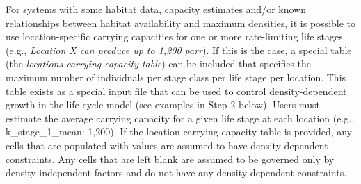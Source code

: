 \documentclass[
  letterpaper,
  DIV=11,
  numbers=noendperiod]{scrreprt}
\begin{document}
For systems with some habitat data, capacity estimates and/or known
relationships between habitat availability and maximum densities, it is
possible to use location-specific carrying capacities for one or more
rate-limiting life stages (e.g., \emph{Location X can produce up to
1,200 parr}). If this is the case, a special table (the \emph{locations
carrying capacity table}) can be included that specifies the maximum
number of individuals per stage class per life stage per location. This
table exists as a special input file that can be used to control
density-dependent growth in the life cycle model (see examples in Step 2
below). Users must estimate the average carrying capacity for a given
life stage at each location (e.g., k\_stage\_1\_mean: 1,200). If the
location carrying capacity table is provided, any cells that are
populated with values are assumed to have density-dependent constraints.
Any cells that are left blank are assumed to be governed only by
density-independent factors and do not have any density-dependent
constraints.
\end{document}
